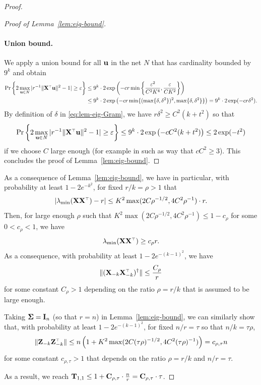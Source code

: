 \documentclass[11pt]{article}
\begin{document}
\begin{proof}
\begin{proof}[Proof of Lemma~\ref{lem:eig-bound}]
\paragraph{Union bound.} We apply a union bound for all $\mathbf u$ in the net $\mathit N$ that has cardinality bounded by $9^k$ and obtain
\begin{align*}
  \Pr \left\{ 2 \max_{\u \in \mathit N} | r^{-1} \| \X^\top \u \|^2 - 1 | \ge \varepsilon \right\} &\le 9^k \cdot 2 \exp \left( - c r \min \left\{ \frac{ \varepsilon^2 }{C^2 K^4 },  \frac{\varepsilon}{C K^2 } \right\} \right) \\
  &\le 9^k \cdot 2 \exp \left( - c r \min \{ (\max\{\delta, \delta^2\} )^2, \max\{\delta, \delta^2\} \} \right) = 9^k \cdot 2 \exp (- c r \delta^2).
\end{align*}
By definition of $\delta$ in \eqref{eq:lem-eig-Gram}, we have $r \delta^2 \ge C^2 (k +  t^2)$ so that 
\[
  \Pr \left\{ 2 \max_{\u \in \mathit N} | r^{-1} \| \X^\top \u \|^2 - 1 | \ge \varepsilon \right\} \le 9^k \cdot 2 \exp \left(- c C^2 ( k + t^2) \right) \le 2 \exp (-t^2)
\]
if we choose $C$ large enough (for example in such as way that $c C^2 \ge 3$). This concludes the proof of Lemma~\ref{lem:eig-bound}.
\end{proof}



As a consequence of Lemma~\ref{lem:eig-bound}, we have in particular, with probability at least $1- 2 e^{-k^2}$, for fixed $r/k = \rho > 1$ that
\[
  |\lambda_{\min} (\X \X^\top) - r| \le K^2 \max ( 2 C \rho^{-1/2}, 4 C^2 \rho^{-1}) \cdot r.
\]
Then, for large enough $\rho$ such that $K^2 \max ( 2 C \rho^{-1/2}, 4 C^2 \rho^{-1}) \le 1 - c_\rho$ for some $0 < c_\rho < 1$, we have
\[
  \lambda_{\min}(\X \X^\top) \ge c_\rho r.
\]
As a consequence, with probability at least $1- 2 e^{-(k-1)^2}$, we have
\[
  \| (\X_{-k}\X_{-k}^\top)^\dagger \| \le \frac{C_\rho}{r}
\]
for some constant $C_\rho > 1$ depending on the ratio $\rho = r/k$ that is assumed to be large enough.

Taking $\mathbf{\Sigma} = \mathbf I_n$ (so that $r = n$) in Lemma~\ref{lem:eig-bound}, we can similarly show that, with probability at least $1- 2 e^{-(k-1)^2}$, for fixed $n/r = \tau$ so that $n/k = \tau \rho$,
\[
  \| \Z_{-k} \Z_{-k}^\top \| \le n \left( 1 + K^2 \max( 2 C (\tau \rho)^{-1/2}, 4 C^2 (\tau \rho)^{-1}) \right) = c_{\rho, \tau} n
\]
for some constant $c_{\rho, \tau} > 1$ that depends on the ratio $\rho = r/k$ and $n/r = \tau$.

As a result, we reach $\mathbf{T}_{1,1} \le 1 + \mathbf C_{\rho, \tau} \cdot \frac{n}{r} = \mathbf C_{\rho, \tau} \cdot \tau$.
 \end{proof}
\end{document}
